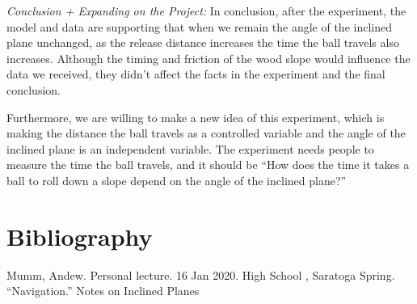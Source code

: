 \documentclass[12pt]{report}
\begin{document}
\emph{Conclusion + Expanding on the Project:}
In conclusion, after the experiment, the model and data are supporting that when we remain the angle of the inclined plane unchanged, as the release distance increases the time the ball travels also increases. Although the timing and friction of the wood slope would influence the data we received, they didn’t affect the facts in the experiment and the final conclusion.

Furthermore, we are willing to make a new idea of this experiment, which is making the distance the ball travels as a controlled variable and the angle of the inclined plane is an independent variable. The experiment needs people to measure the time the ball travels, and it should be “How does the time it takes a ball to roll down a slope depend on the angle of the inclined plane?”
\section{Bibliography}
Mumm, Andew. Personal lecture. 16 Jan 2020. \newline
High School , Saratoga Spring. “Navigation.” Notes on Inclined Planes
\end{document}
